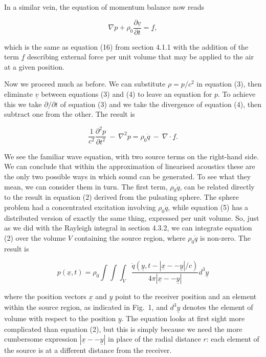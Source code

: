  In a similar vein, the equation of momentum balance now reads 

  $$\nabla p + \rho_0 \dfrac{\partial \underline{v}}{\partial t} = 
  \underline{f} , \tag{4}$$ 

  which is the same as equation (16) from section 4.1.1 with the addition of 
  the term $\underline{f}$ describing external force per unit volume that may 
  be applied to the air at a given position. 

  Now we proceed much as before. We can substitute $\rho = p/c^2$ in equation 
  (3), then eliminate $\underline{v}$ between equations (3) and (4) to leave an 
  equation for $p$. To achieve this we take $\partial/\partial t$ of equation 
  (3) and we take the divergence of equation (4), then subtract one from the 
  other. The result is 

  $$\dfrac{1}{c^2} \dfrac{\partial^2 p}{\partial t^2} \mathrm{~}-\mathrm{~} 
  \nabla^2 p = \rho_0 \dot{q} \mathrm{~}-\mathrm{~} \nabla \cdot \underline{f} 
  .\tag{5}$$ 

  We see the familiar wave equation, with two source terms on the right-hand 
  side. We can conclude that within the approximation of linearised acoustics 
  these are the only two possible ways in which sound can be generated. To see 
  what they mean, we can consider them in turn. The first term, $\rho_0 
  \dot{q}$, can be related directly to the result in equation (2) derived from 
  the pulsating sphere. The sphere problem had a concentrated excitation 
  involving $\rho_0 \dot{q}$, while equation (5) has a distributed version of 
  exactly the same thing, expressed per unit volume. So, just as we did with 
  the Rayleigh integral in section 4.3.2, we can integrate equation (2) over 
  the volume $V$ containing the source region, where $\rho_0 \dot{q}$ is 
  non-zero. The result is 

  $$p(\underline{x},t)=\rho_0 \int \int 
  \int_V{\dfrac{\dot{q}(\underline{y},t-|\underline{x} -- \underline{y}|/c)}{4 
  \pi |\underline{x} -- \underline{y}|} d^3 \underline{y}} \tag{6}$$ 

  where the position vectors $\underline{x}$ and $\underline{y}$ point to the 
  receiver position and an element within the source region, as indicated in 
  Fig.\ 1, and $d^3 \underline{y}$ denotes the element of volume with respect 
  to the position $\underline{y}$. The equation looks at first sight more 
  complicated than equation (2), but this is simply because we need the more 
  cumbersome expression $|\underline{x} -- \underline{y}|$ in place of the 
  radial distance $r$: each element of the source is at a different distance 
  from the receiver. 

